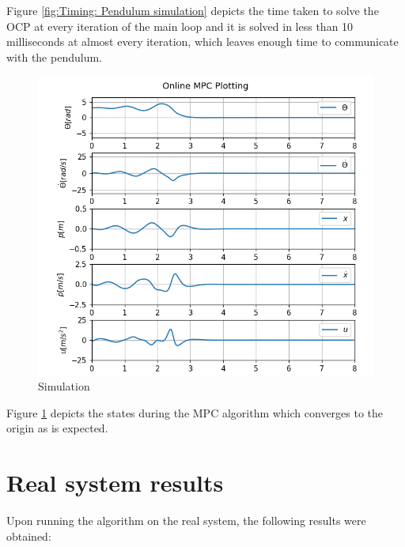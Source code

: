 Figure \ref{fig:Timing: Pendulum simulation} depicts the time taken to solve the OCP at every iteration of the main loop and it is solved in less than 10 milliseconds at almost every iteration, which leaves enough time to communicate with the pendulum.


\begin{figure}[H]
	\centering
	\includegraphics[width=\textwidth]{"src/Images/PC_Simulation_OnlinePlot.png"}
	\caption{Simulation}
	\label{fig:Simulation}
\end{figure}

Figure \ref{fig:Simulation} depicts the states during the MPC algorithm which converges to the origin as is expected.  
 
 \clearpage
 
\section{Real system results}

Upon running the algorithm on the real system, the following results were obtained:

